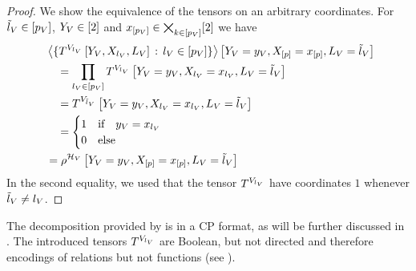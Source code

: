 \begin{proof}
	We show the equivalence of the tensors on an arbitrary coordinates.
	For $\tilde{l}_{V}\in[p_{V}]$, $Y_{V}\in[2]$ and $x_{[p_{V}]}\in\bigtimes_{k\in[p_{V}]}[2]$ we have
	\begin{align*}
		& \contractionof{
			\{\selectorcomponentofat{\selindexof{\vselectionsymbol}}{\vselectionheadvar,\catvariableof{\selindexof{\vselectionsymbol}},\selvariableof{\vselectionsymbol}} \, : \, \selindexofin{\vselectionsymbol}\}
		}{\indexedheadvariableof{\vselectionsymbol},\indexedcatvariableof{[\parlegdim]},\selvariableof{\vselectionsymbol} = \tilde{\selindex}_{\vselectionsymbol}} \\
		& \quad = 
		\prod_{\selindexofin{\vselectionsymbol}} \selectorcomponentofat{\selindexof{\vselectionsymbol}}{
			\indexedheadvariableof{\vselectionsymbol},\indexedcatvariableof{\selindexof{\vselectionsymbol}},\selvariableof{\vselectionsymbol}=\tilde{\selindex}_{\vselectionsymbol}
			} \\
		& \quad = \selectorcomponentofat{\tilde{\selindex}_{\vselectionsymbol}}{
			\indexedheadvariableof{\vselectionsymbol},\indexedcatvariableof{\selindexof{\vselectionsymbol}},\selvariableof{\vselectionsymbol}=\tilde{\selindex}_{\vselectionsymbol}
		} \\
		& \quad = 
		\begin{cases}
		 	1 & \text{if} \quad \headindexof{\vselectionsymbol} = \catindexof{\selindexof{\vselectionsymbol}} \\
		 	0 & \text{else}  
		 \end{cases} \\ 
		 & = \rencodingofat{\vselectionmap}{\indexedheadvariableof{\vselectionsymbol},\indexedcatvariableof{[\parlegdim]},\selvariableof{\vselectionsymbol}=\tilde{\selindex}_{\vselectionsymbol}}
	\end{align*}
	In the second equality, we used that the tensor $T^{V_{l_{V}}}$ have coordinates $1$ whenever $\tilde{l}_{V}\neq l_{V}$.
\end{proof}


The decomposition provided by  is in a CP format, as will be further discussed in .
The introduced tensors $T^{V_{l_{V}}}$ are Boolean, but not directed and therefore encodings of relations but not functions (see ).

